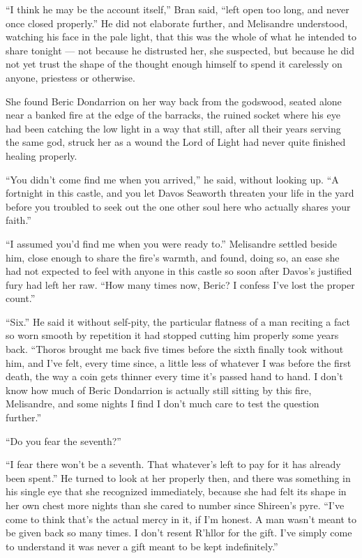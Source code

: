 “I think he may be the account itself,” Bran said, “left open too long, and never once closed properly.” He did not elaborate further, and Melisandre understood, watching his face in the pale light, that this was the whole of what he intended to share tonight — not because he distrusted her, she suspected, but because he did not yet trust the shape of the thought enough himself to spend it carelessly on anyone, priestess or otherwise.

\sceneBreak

She found Beric Dondarrion on her way back from the godswood, seated alone near a banked fire at the edge of the barracks, the ruined socket where his eye had been catching the low light in a way that still, after all their years serving the same god, struck her as a wound the Lord of Light had never quite finished healing properly.

“You didn’t come find me when you arrived,” he said, without looking up. “A fortnight in this castle, and you let Davos Seaworth threaten your life in the yard before you troubled to seek out the one other soul here who actually shares your faith.”

“I assumed you’d find me when you were ready to.” Melisandre settled beside him, close enough to share the fire’s warmth, and found, doing so, an ease she had not expected to feel with anyone in this castle so soon after Davos’s justified fury had left her raw. “How many times now, Beric? I confess I’ve lost the proper count.”

“Six.” He said it without self-pity, the particular flatness of a man reciting a fact so worn smooth by repetition it had stopped cutting him properly some years back. “Thoros brought me back five times before the sixth finally took without him, and I’ve felt, every time since, a little less of whatever I was before the first death, the way a coin gets thinner every time it’s passed hand to hand. I don’t know how much of Beric Dondarrion is actually still sitting by this fire, Melisandre, and some nights I find I don’t much care to test the question further.”

“Do you fear the seventh?”

“I fear there won’t be a seventh. That whatever’s left to pay for it has already been spent.” He turned to look at her properly then, and there was something in his single eye that she recognized immediately, because she had felt its shape in her own chest more nights than she cared to number since Shireen’s pyre. “I’ve come to think that’s the actual mercy in it, if I’m honest. A man wasn’t meant to be given back so many times. I don’t resent R’hllor for the gift. I’ve simply come to understand it was never a gift meant to be kept indefinitely.”

